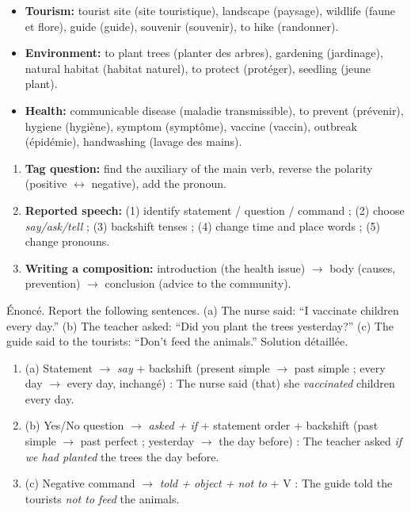\documentclass[11pt]{article}
\begin{document}
\begin{exemplebox}
\begin{itemize}
\item \textbf{Tourism:} tourist site (site touristique), landscape (paysage), wildlife (faune et flore), guide (guide), souvenir (souvenir), to hike (randonner).
\item \textbf{Environment:} to plant trees (planter des arbres), gardening (jardinage), natural habitat (habitat naturel), to protect (protéger), seedling (jeune plant).
\item \textbf{Health:} communicable disease (maladie transmissible), to prevent (prévenir), hygiene (hygiène), symptom (symptôme), vaccine (vaccin), outbreak (épidémie), handwashing (lavage des mains).
\end{itemize}
\end{exemplebox}

\begin{methode}
\begin{enumerate}
\item \textbf{Tag question:} find the auxiliary of the main verb, reverse the polarity (positive $\leftrightarrow$ negative), add the pronoun.
\item \textbf{Reported speech:} (1) identify statement / question / command ; (2) choose \emph{say/ask/tell} ; (3) backshift tenses ; (4) change time and place words ; (5) change pronouns.
\item \textbf{Writing a composition:} introduction (the health issue) $\to$ body (causes, prevention) $\to$ conclusion (advice to the community).
\end{enumerate}
\end{methode}

\begin{exoresolu}
Énoncé. Report the following sentences. (a) The nurse said: ``I vaccinate children every day.'' (b) The teacher asked: ``Did you plant the trees yesterday?'' (c) The guide said to the tourists: ``Don't feed the animals.''
\tcblower
Solution détaillée.
\begin{enumerate}
\item (a) Statement $\to$ \emph{say} + backshift (present simple $\to$ past simple ; every day $\to$ every day, inchangé) : The nurse said (that) she \emph{vaccinated} children every day.
\item (b) Yes/No question $\to$ \emph{asked + if} + statement order + backshift (past simple $\to$ past perfect ; yesterday $\to$ the day before) : The teacher asked \emph{if we had planted} the trees the day before.
\item (c) Negative command $\to$ \emph{told + object + not to} + V : The guide told the tourists \emph{not to feed} the animals.
\end{enumerate}
\end{exoresolu}
\end{document}
